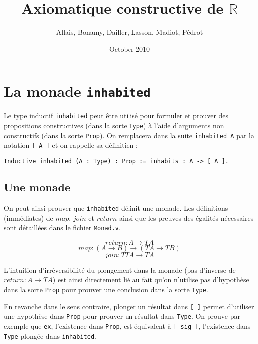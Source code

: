 \documentclass[10pt]{article}
\begin{document}
\title{Axiomatique constructive de $\mathbb{R}$}
\author{Allais, Bonamy, Dailler, Lasson, Madiot, Pédrot}
\date{October 2010}

\maketitle

\section{La monade {\tt inhabited}}

Le type inductif {\tt inhabited} peut être utilisé pour formuler et prouver des propositions constructives (dans la sorte {\tt Type}) à l'aide d'arguments non constructifs (dans la sorte {\tt Prop}). On remplacera dans la suite {\tt inhabited A} par la notation {\tt [ A ]} et on rappelle sa définition :

\begin{verbatim}
Inductive inhabited (A : Type) : Prop := inhabits : A -> [ A ].
\end{verbatim}

\subsection{Une monade}

On peut ainsi prouver que {\tt inhabited} définit une monade. Les définitions (immédiates) de $map$, $join$ et $return$ ainsi que les preuves des égalités nécessaires sont détaillées dans le fichier {\tt Monad.v}.

$$return : A → TA$$
$$map : (A → B) → (TA → TB)$$
$$join : TTA → TA$$

L'intuition d'irréversibilité du plongement dans la monade (pas d'inverse de $return : A → TA$) est ainsi directement lié au fait qu'on n'utilise pas d'hypothèse dans la sorte {\tt Prop} pour prouver une conclusion dans la sorte {\tt Type}.


En revanche dans le sens contraire, plonger un résultat dans {\tt [ ]} permet d'utiliser une hypothèse dans {\tt Prop} pour prouver un résultat dans {\tt Type}. On prouve par exemple que {\tt ex}, l'existence dans {\tt Prop}, est équivalent à {\tt [ sig ]}, l'existence dans {\tt Type} plongée dans {\tt inhabited}.
\end{document}
